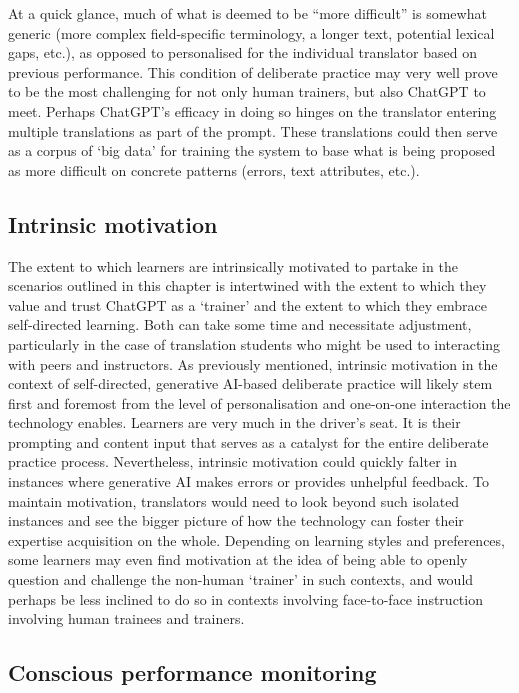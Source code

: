 \documentclass[output=paper]{langscibook}
\begin{document}
At a quick glance, much of what is deemed to be “more difficult” is somewhat generic (more complex field-specific terminology, a longer text, potential lexical gaps, etc.), as opposed to personalised for the individual translator based on previous performance. This condition of deliberate practice may very well prove to be the most challenging for not only human trainers, but also ChatGPT to meet. Perhaps ChatGPT’s efficacy in doing so hinges on the translator entering multiple translations as part of the prompt. These translations could then serve as a corpus of ‘big data’ for training the system to base what is being proposed as more difficult on concrete patterns (errors, text attributes, etc.).

\subsection{Intrinsic motivation}

The extent to which learners are intrinsically motivated to partake in the scenarios outlined in this chapter is intertwined with the extent to which they value and trust ChatGPT as a ‘trainer’ and the extent to which they embrace self-directed learning. Both can take some time and necessitate adjustment, particularly in the case of translation students who might be used to interacting with peers and instructors. As previously mentioned, intrinsic motivation in the context of self-directed, generative AI-based deliberate practice will likely stem first and foremost from the level of personalisation and one-on-one interaction the technology enables. Learners are very much in the driver’s seat. It is their prompting and content input that serves as a catalyst for the entire deliberate practice process. Nevertheless, intrinsic motivation could quickly falter in instances where generative AI makes errors or provides unhelpful feedback. To maintain motivation, translators would need to look beyond such isolated instances and see the bigger picture of how the technology can foster their expertise acquisition on the whole. Depending on learning styles and preferences, some learners may even find motivation at the idea of being able to openly question and challenge the non-human ‘trainer’ in such contexts, and would perhaps be less inclined to do so in contexts involving face-to-face instruction involving human trainees and trainers.~

\subsection{Conscious performance monitoring}
\end{document}
